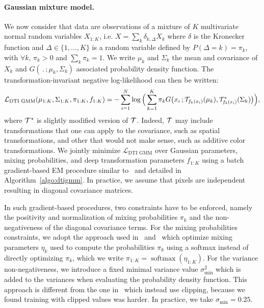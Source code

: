 \documentclass{article}
\DeclareMathOperator*{\softmax}{softmax}
\begin{document}
\paragraph{Gaussian mixture model.}
We now consider that data are observations of a mixture of $K$ multivariate normal random 
variables $X_{1:K}$, i.e. $X = \sum_{k} \delta_{k, \Delta}X_k$ where $\delta$ is the 
Kronecker function and $\Delta \in \{1,\ldots,K\}$ is a random variable defined by $P(\Delta 
= k) = \pi_k$, with $\forall k,\,\pi_k>0$ and $\sum_k\pi_k = 1$. We write $\mu_k$ and 
$\Sigma_k$ the mean and covariance of $X_k$
and $G(\,\textbf{.}\,;\mu_k,\Sigma_k)$ associated probability density function.  The 
transformation-invariant negative log-likelihood can then be written:
\begin{equation}
  \mathcal{L}_{\textrm{DTI GMM}}(\mu_{1:K}, \Sigma_{1:K}, \pi_{1:K}, f_{1:K}) = 
  -\sum_{i=1}^{N} \log\Big(\sum_{k=1}^K\pi_k G\big(x_i \,; 
  \scaleto{\cT_{f_k(x_i)}}{10pt}(\mu_{k}), 
  \scaleto{\cT^{*}_{f_k(x_i)}}{11pt}(\Sigma_{k})\big)\Big),
  \label{eq:dtigmm}
\end{equation}
where ${\mathcal T}^{*}$ is slightly modified version of ${\mathcal T}$. Indeed, ${\mathcal T}$ may include 
transformations that one can apply to the covariance, such as spatial transformations, and 
other that would not make sense, such as additive color transformations. We jointly minimize 
$\mathcal{L}_{\textrm{DTI GMM}}$ over Gaussian parameters, mixing probabilities, and deep 
transformation parameters $f_{1:K}$ using a batch gradient-based EM procedure similar 
to~\cite{hosseiniMatrixManifoldOptimization2015,greffNeuralExpectationMaximization2017, 
gepperthGradientbasedTrainingGaussian2019} and detailed in Algorithm~\ref{algo:dtigmm}.
In practice, we assume that pixels are independent resulting in diagonal covariance matrices.  

In such gradient-based procedures, two constraints have to be enforced, namely the 
positivity and normalization of mixing probabilities $\pi_k$ and the non-negativeness of the
diagonal covariance terms.  For the mixing probabilities constraints, we adopt the approach 
used in~\cite{hosseiniMatrixManifoldOptimization2015} 
and~\cite{gepperthGradientbasedTrainingGaussian2019} which optimize mixing parameters 
$\eta_k$ used to compute the probabilities $\pi_k$ using a softmax instead of directly 
optimizing $\pi_k$, which we write $\pi_{1:K} = \softmax(\eta_{1:K})$. For the variance 
non-negativeness, we introduce a fixed minimal variance value $\sigma_{\mathrm{min}}^2$ which 
is added to the variances when evaluating the probability density function. This approach is 
different from the one in~\cite{gepperthGradientbasedTrainingGaussian2019} which instead use 
clipping, because we found training with clipped values was harder. In practice, we take 
$\sigma_{\textrm{min}} = 0.25$.
\end{document}
